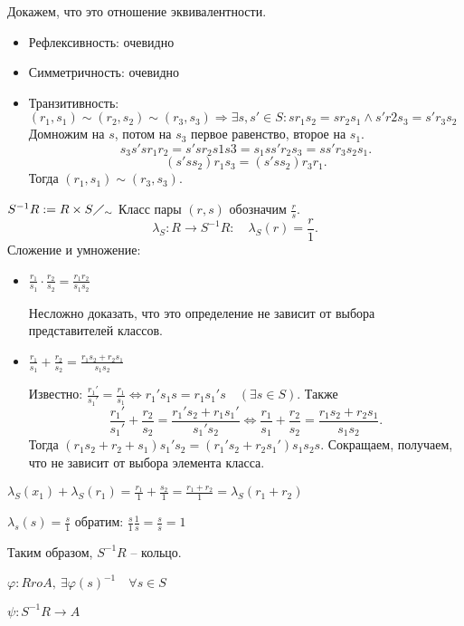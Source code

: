 \documentclass[11pt]{book}
\theoremstyle{definition}
\theoremstyle{plain}
\theoremstyle{plain}
\theoremstyle{definition}
\theoremstyle{remark}
\begin{document}
Докажем, что это отношение эквивалентности.
\begin{itemize}
    \item Рефлексивность: очевидно
    \item Симметричность: очевидно
    \item Транзитивность:
	$ (r_1, s_1) \sim (r_2, s_2) \sim (r_3, s_3) \Longrightarrow \exists  s, s' \in S:
	sr_1s_2 = s r_2 s_1 \wedge s' r 2 s_3 = s' r_3 s_2$ 
	Домножим на $ s$, потом на $ s_3$ первое равенство, второе на $ s_1$.
	\[
	s_3s' s r_1 r_2 = s' s r_2 s1 s 3 = s_1 s s' r_2 s_3 = s s' r_3 s_2 s_1
	.\] 
	\[
	    (s's s_2) r_1 s_3= (s' s s_2 )r_3 r_1
	.\]  
	Тогда $ (r_1, s_1) \sim (r_3, s_3)$.
\end{itemize}
$ S ^{-1 }R := R \times  S \diagup _ \sim $
Класс пары $ (r, s)$ обозначим $ \frac{r}{s}$.
\[
    \lambda_S : R \to  S^{-1} R: \quad \lambda_S (r) = \frac{r}{1}
.\] 
Сложение и умножение:
\begin{itemize}
    \item $ \frac{r_1}{s_1} \cdot \frac{r_2}{s_2} = \frac{r_1 r_2}{s_1 s_2}$ 

	Несложно доказать, что это определение не зависит от выбора представителей классов.
    \item $ \frac{r_1}{s_1} + \frac{r_2}{s_2} = \frac{r_1 s_2 + r_2 s_1}{s_1 s_2}$ 

 Известно: $ \frac{r_1'}{s_1'} = \frac{r_1}{s_1} \Leftrightarrow r_1' s_1 s = r_1 s_1' s \quad (\exists  s \in  S)$. Также 
	\[
	    \frac{r_1'}{s_1' }  + \frac{r_2}{s_2} = \frac{r_1' s_2 + r_1 s_1'}{s_1's_2} \Longleftrightarrow 
\frac{r_1}{s_1} + \frac{r_2}{s_2} = \frac{r_1 s_2 + r_2 s_1}{s_1 s_2} 	.\] 
Тогда $ (r_1 s_2 + r_2 + s_1) s_1' s_2 = (r_1' s_2 + r_2 s_1') s_1 s_2 s$.
Сокращаем, получаем, что не зависит от выбора элемента класса.
\end{itemize}

$ \lambda _S(x_1) + \lambda_S(r_1) = \frac{r_1}{1} + \frac{s_2}{1} = \frac{r_1 + r_2}{1}= \lambda_S(r_1 + r_2)$

$    \lambda_s(s) = \frac{s}{1} $ обратим: $ \frac{s}{1} \frac{1}{s} = \frac{s}{s}=1$

Таким образом, $ S^{-1}R$ -- кольцо.

$ \varphi  : R ro A , ~ \exists  \varphi (s)^{-1} \quad \forall  s \in  S$

$ \psi: S^{-1} R \to  A$ 
\end{document}
